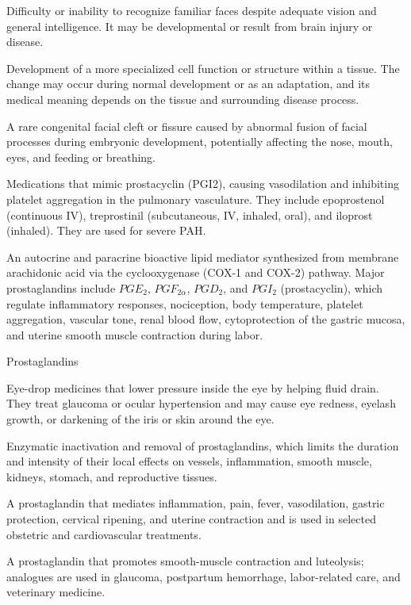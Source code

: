  Difficulty or inability to recognize familiar faces despite adequate vision and general intelligence. It may be developmental or result from brain injury or disease.

 Development of a more specialized cell function or structure within a tissue. The change may occur during normal development or as an adaptation, and its medical meaning depends on the tissue and surrounding disease process.

 A rare congenital facial cleft or fissure caused by abnormal fusion of facial processes during embryonic development, potentially affecting the nose, mouth, eyes, and feeding or breathing.

 Medications that mimic prostacyclin (PGI2), causing vasodilation and inhibiting platelet
aggregation in the pulmonary vasculature. They include epoprostenol (continuous IV),
treprostinil (subcutaneous, IV, inhaled, oral), and iloprost (inhaled). They are used
for severe PAH.

 An autocrine and paracrine bioactive lipid mediator synthesized from membrane arachidonic acid via the cyclooxygenase (COX-1 and COX-2) pathway. Major prostaglandins include $PGE_2$, $PGF_{2\alpha}$, $PGD_2$, and $PGI_2$ (prostacyclin), which regulate inflammatory responses, nociception, body temperature, platelet aggregation, vascular tone, renal blood flow, cytoprotection of the gastric mucosa, and uterine smooth muscle contraction during labor.

\synonyms
Prostaglandins

 Eye-drop medicines that lower pressure inside the eye by helping fluid drain. They treat glaucoma or ocular hypertension and may cause eye redness, eyelash growth, or darkening of the iris or skin around the eye.

 Enzymatic inactivation and removal of prostaglandins, which limits the duration and intensity of their local effects on vessels, inflammation, smooth muscle, kidneys, stomach, and reproductive tissues.

 A prostaglandin that mediates inflammation, pain, fever, vasodilation, gastric protection, cervical ripening, and uterine contraction and is used in selected obstetric and cardiovascular treatments.

 A prostaglandin that promotes smooth-muscle contraction and luteolysis; analogues are used in glaucoma, postpartum hemorrhage, labor-related care, and veterinary medicine.

